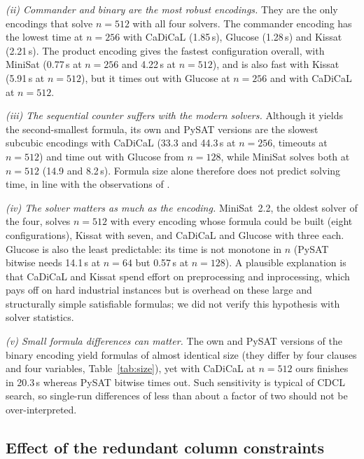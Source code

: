 \documentclass[a4paper,fleqn]{cas-sc}
\begin{document}
\emph{(ii) Commander and binary are the most robust encodings.} They are the only encodings that solve $n=512$ with all four solvers. The commander encoding has the lowest time at $n=256$ with CaDiCaL (1.85\,s), Glucose (1.28\,s) and Kissat (2.21\,s). The product encoding gives the fastest configuration overall, with MiniSat (0.77\,s at $n=256$ and 4.22\,s at $n=512$), and is also fast with Kissat (5.91\,s at $n=512$), but it times out with Glucose at $n=256$ and with CaDiCaL at $n=512$.

\emph{(iii) The sequential counter suffers with the modern solvers.} Although it yields the second-smallest formula, its own and PySAT versions are the slowest subcubic encodings with CaDiCaL (33.3 and 44.3\,s at $n=256$, timeouts at $n=512$) and time out with Glucose from $n=128$, while MiniSat solves both at $n=512$ (14.9 and 8.2\,s). Formula size alone therefore does not predict solving time, in line with the observations of \citet{frisch2010sat}.

\emph{(iv) The solver matters as much as the encoding.} MiniSat~2.2, the oldest solver of the four, solves $n=512$ with every encoding whose formula could be built (eight configurations), Kissat with seven, and CaDiCaL and Glucose with three each. Glucose is also the least predictable: its time is not monotone in $n$ (PySAT bitwise needs 14.1\,s at $n=64$ but 0.57\,s at $n=128$). A plausible explanation is that CaDiCaL and Kissat spend effort on preprocessing and inprocessing, which pays off on hard industrial instances but is overhead on these large and structurally simple satisfiable formulas; we did not verify this hypothesis with solver statistics.

\emph{(v) Small formula differences can matter.} The own and PySAT versions of the binary encoding yield formulas of almost identical size (they differ by four clauses and four variables, Table~\ref{tab:size}), yet with CaDiCaL at $n=512$ ours finishes in 20.3\,s whereas PySAT bitwise times out. Such sensitivity is typical of CDCL search, so single-run differences of less than about a factor of two should not be over-interpreted.

\subsection{Effect of the redundant column constraints}\label{sec:ablation}
\end{document}
